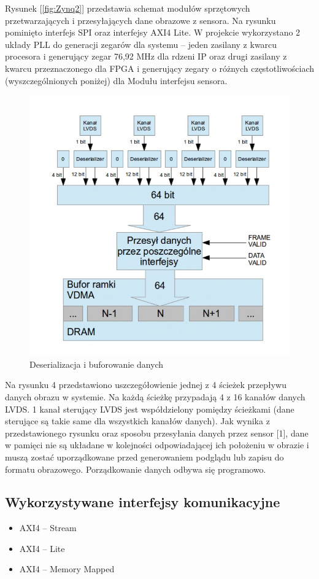 \documentclass[a4paper,11pt,oneside]{report}  %
\begin{document}
 Rysunek [\ref{fig:Zynq2}] przedstawia schemat modułów sprzętowych przetwarzających i przesyłających dane obrazowe z sensora. Na rysunku pominięto interfejs SPI oraz interfejsy AXI4 Lite. W projekcie wykorzystano 2 układy PLL do generacji zegarów dla systemu – jeden zasilany z kwarcu procesora i generujący zegar 76,92 MHz dla rdzeni IP oraz drugi zasilany z kwarcu przeznaczonego dla FPGA i generujący zegary o różnych częstotliwościach (wyszczególnionych poniżej) dla Modułu interfejsu sensora.
 
\begin{figure}[H]
	\centering
	\includegraphics[width=12cm]{data2.png}
	\caption{Deserializacja i buforowanie danych}
	\label{fig:Zynq3}
\end{figure}

Na rysunku 4 przedstawiono uszczegółowienie jednej z 4 ścieżek przepływu danych obrazu w systemie. Na każdą ścieżkę przypadają 4 z 16 kanałów danych LVDS. 1 kanał sterujący LVDS jest współdzielony pomiędzy ścieżkami (dane sterujące są takie same dla wszystkich kanałów danych). Jak wynika z przedstawionego rysunku oraz sposobu przesyłania danych przez sensor [1], dane w pamięci nie są układane w kolejności odpowiadającej ich położeniu w obrazie i muszą zostać uporządkowane przed generowaniem podglądu lub zapisu do formatu obrazowego. Porządkowanie danych odbywa się programowo.

\subsection{Wykorzystywane interfejsy komunikacyjne}
\begin{itemize}
\item AXI4 – Stream 
\item AXI4 – Lite 
\item AXI4 – Memory Mapped
\end{itemize}
\end{document}
